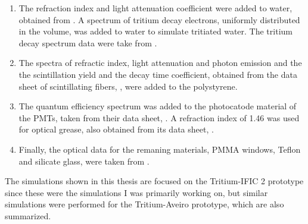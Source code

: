 \begin{enumerate}
%
\item{} The refraction index and light attenuation coefficient were added to water, obtained from \cite{WaterPropertiesSimulation}. A spectrum of tritium decay electrons, uniformly distributed in the volume, was added to water to simulate tritiated water. The tritium decay spectrum data were take from \cite{TritiumEmissionSpectrum}.

\item{} The spectra of refractic index, light attenuation and photon emission and the the scintillation yield and the decay time coefficient, obtained from the data sheet of scintillating fibers, \cite{DataSheetBCF12Fiber}, were added to the polystyrene.

\item{} The quantum efficiency spectrum was added to the photocatode material of the PMTs, taken from their data sheet, \cite{DataSheetPMTs}. A refraction index of 1.46 was used for optical grease, also obtained from its data sheet, \cite{OpticalGrease}.

\item{} Finally, the optical data for the remaning materials, PMMA windows, Teflon and silicate glass, were taken from \cite{NEMODataSimulation}.

\end{enumerate} 

The simulations shown in this thesis are focused on the Tritium-IFIC 2 prototype since these were the simulations I was primarily working on, but similar simulations were performed for the Tritium-Aveiro prototype, which are also summarized.